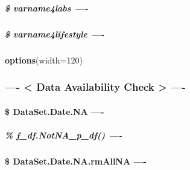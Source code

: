 \documentclass[
]{article}
\newenvironment{Shaded}{\begin{snugshade}}{\end{snugshade}}
\newcommand{\AttributeTok}[1]{\textcolor[rgb]{0.13,0.29,0.53}{#1}}
\newcommand{\DecValTok}[1]{\textcolor[rgb]{0.00,0.00,0.81}{#1}}
\newcommand{\FunctionTok}[1]{\textcolor[rgb]{0.13,0.29,0.53}{\textbf{#1}}}
\newcommand{\NormalTok}[1]{#1}
\begin{document}
\hypertarget{varname4labs--}{%
\subparagraph{\$ varname4labs ----}\label{varname4labs--}}

\hypertarget{varname4lifestyle--}{%
\subparagraph{\$ varname4lifestyle ----}\label{varname4lifestyle--}}

\begin{Shaded}
\begin{Highlighting}[]
\FunctionTok{options}\NormalTok{(}\AttributeTok{width=}\DecValTok{120}\NormalTok{)}
\end{Highlighting}
\end{Shaded}

\hypertarget{data-availability-check--}{%
\subsubsection{---- \textless{} Data Availability Check \textgreater{}
----}\label{data-availability-check--}}

\hypertarget{dataset.date.na--}{%
\paragraph{\$ DataSet.Date.NA ----}\label{dataset.date.na--}}

\hypertarget{f_df.notna_p_df--}{%
\subparagraph{\% f\_df.NotNA\_p\_df() ----}\label{f_df.notna_p_df--}}

\hypertarget{dataset.date.na.rmallna--}{%
\paragraph{\$ DataSet.Date.NA.rmAllNA
----}\label{dataset.date.na.rmallna--}}
\end{document}
